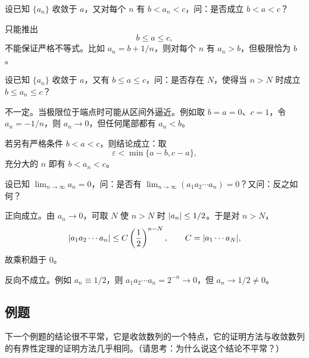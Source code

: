 \begin{xthought}[5]
设已知 $\{a_n\}$ 收敛于 $a$，又对每个 $n$ 有 $b<a_n<c$，问：是否成立 $b<a<c$？
\end{xthought}
\begin{xsolution}
只能推出
\[
  b\le a\le c,
\]
不能保证严格不等式。比如 $a_n=b+1/n$，则对每个 $n$ 有 $a_n>b$，但极限恰为 $b$。
\end{xsolution}


\begin{xthought}[6]
设已知 $\{a_n\}$ 收敛于 $a$，又有 $b\le a\le c$，问：是否存在 $N$，使得当 $n>N$ 时成立 $b\le a_n\le c$？
\end{xthought}
\begin{xsolution}
不一定。当极限位于端点时可能从区间外逼近。例如取 $b=a=0$、$c=1$，令 $a_n=-1/n$，则 $a_n\to0$，但任何尾部都有 $a_n<b$。

若另有严格条件 $b<a<c$，则结论成立：取
\[
  \varepsilon<\min\{a-b,c-a\},
\]
充分大的 $n$ 即有 $b<a_n<c$。
\end{xsolution}


\begin{xthought}[7]
设已知 $\displaystyle\lim_{n\to\infty}a_n=0$，问：是否有 $\displaystyle\lim_{n\to\infty}(a_1a_2\cdots a_n)=0$？又问：反之如何？
\end{xthought}
\begin{xsolution}
正向成立。由 $a_n\to0$，可取 $N$ 使 $n>N$ 时 $\lvert a_n\rvert\le1/2$。于是对 $n>N$，
\[
  \lvert a_1a_2\cdots a_n\rvert
  \le C\left(\frac12\right)^{n-N},
  \qquad
  C=\lvert a_1\cdots a_N\rvert,
\]
故乘积趋于 $0$。

反向不成立。例如 $a_n\equiv1/2$，则 $a_1a_2\cdots a_n=2^{-n}\to0$，但 $a_n\to1/2\ne0$。
\end{xsolution}


\subsection{例题}

下一个例题的结论很不平常，它是收敛数列的一个特点，它的证明方法与收敛数列的有界性定理的证明方法几乎相同。（请思考：为什么说这个结论不平常？）

